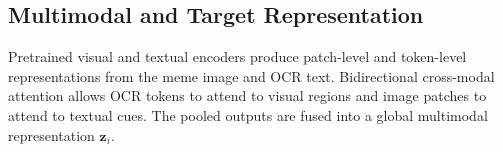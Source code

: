 \documentclass[11pt]{article}
\begin{document}





\subsection{Multimodal and Target Representation}
\label{subsec:multimodal-target}

Pretrained visual and textual encoders produce patch-level and
token-level representations from the meme image and OCR text.
Bidirectional cross-modal attention allows OCR tokens to attend to
visual regions and image patches to attend to textual cues. The pooled
outputs are fused into a global multimodal representation
$\mathbf{z}_i$.
\end{document}
